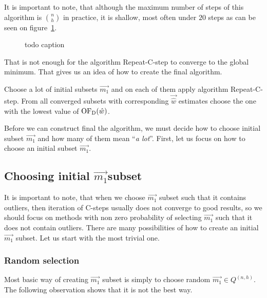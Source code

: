 It is important to note, that although the maximum number of steps of this algorithm is ${n \choose h}$ in practice, it is shallow, most often under $20$ steps as can be seen on figure~\ref{figure:repeat:c:steps:cnt:converge}.

\begin{figure}[h]
\centering
{}
\caption{todo caption}
\label{figure:repeat:c:steps:cnt:converge}
\end{figure}

That is not enough for the algorithm Repeat-C-step to converge to the global minimum. That gives us an idea of how to create the final algorithm. \cite{rouss:2000}

Choose a lot of initial subsets $\vec{m_1}$ and on each of them apply algorithm Repeat-C-step. From all converged subsets with corresponding $\vec{\hat{w}}$ estimates choose the one with the lowest value of $\operatorname{OF_D}(\hat{w})$. 

Before we can construct final the algorithm, we must decide how to choose initial subset $\vec{m_1}$ and how many of them mean ``\emph{a lot}''. First, let us focus on how to choose an initial subset $\vec{m_1}$.




\subsection{Choosing initial $\vec{m_1}$subset}

It is important to note, that when we choose $\vec{m_1}$ subset such that it contains outliers, then iteration of  C-steps usually does not converge to good results, so we should focus on methods with non zero probability of selecting $\vec{m_1}$ such that it does not contain outliers.
There are many possibilities of how to create an initial $\vec{m_1}$ subset. Let us start with the most trivial one.


\subsubsection*{Random selection} \label{section:random:h:samples}
Most basic way of creating $\vec{m_1}$ subset is simply to choose random $\vec{m_1} \in Q^{(n, h)}$. The following observation shows that it is not the best way.

